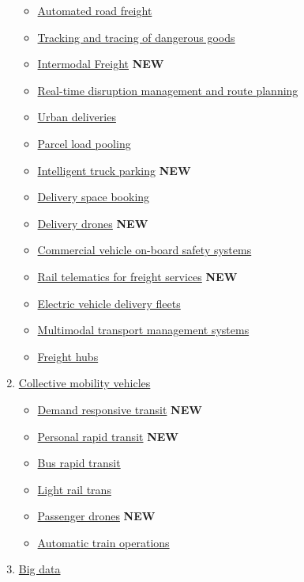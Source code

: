 \documentclass[
]{book}
\providecommand{\tightlist}{%
  \setlength{\itemsep}{0pt}\setlength{\parskip}{0pt}}
\begin{document}
\begin{enumerate}
  \begin{itemize}
  \tightlist
  \item
    \protect\hyperlink{automated_road_freight}{Automated road freight}
  \item
    \protect\hyperlink{dangerous_goods}{Tracking and tracing of dangerous goods}
  \item
    \protect\hyperlink{intermodal_freight}{Intermodal Freight} \textbf{NEW}
  \item
    \protect\hyperlink{disruption_management}{Real-time disruption management and route planning}
  \item
    \protect\hyperlink{urban_delivery}{Urban deliveries}
  \item
    \protect\hyperlink{parcel_pooling}{Parcel load pooling}
  \item
    \protect\hyperlink{intelligent_truck_park}{Intelligent truck parking} \textbf{NEW}
  \item
    \protect\hyperlink{space_book}{Delivery space booking}
  \item
    \protect\hyperlink{delivery_drone}{Delivery drones} \textbf{NEW}
  \item
    \protect\hyperlink{comm_veh_safety}{Commercial vehicle on-board safety systems}
  \item
    \protect\hyperlink{rail_telematics_freight}{Rail telematics for freight services} \textbf{NEW}
  \item
    \protect\hyperlink{electric_delivery_fleets}{Electric vehicle delivery fleets}
  \item
    \protect\hyperlink{mtms}{Multimodal transport management systems}
  \item
    \protect\hyperlink{freight_hubs}{Freight hubs}
  \end{itemize}
\item
  \protect\hyperlink{collective}{Collective mobility vehicles}

  \begin{itemize}
  \tightlist
  \item
    \protect\hyperlink{drt}{Demand responsive transit} \textbf{NEW}
  \item
    \protect\hyperlink{prt}{Personal rapid transit} \textbf{NEW}
  \item
    \protect\hyperlink{brt}{Bus rapid transit}
  \item
    \protect\hyperlink{lrt}{Light rail trans}
  \item
    \protect\hyperlink{passenger_drones}{Passenger drones} \textbf{NEW}
  \item
    \protect\hyperlink{automatic_train}{Automatic train operations}
  \end{itemize}
\item
  \protect\hyperlink{big}{Big data}


\end{enumerate}
\end{document}
